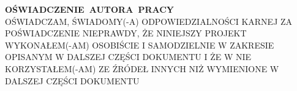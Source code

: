 \begin{titlepage}
\begin{flushright}
\begin{minipage}[!h]{13cm}
\mbox{\large{\scshape \textbf{OŚWIADCZENIE AUTORA PRACY}}}\\[3mm] 
{\scshape OŚWIADCZAM, ŚWIADOMY(-A) ODPOWIEDZIALNOŚCI KARNEJ ZA POŚWIADCZENIE NIEPRAWDY, ŻE NINIEJSZY PROJEKT WYKONAŁEM(-AM) OSOBIŚCIE I SAMODZIELNIE W ZAKRESIE OPISANYM W DALSZEJ CZĘŚCI DOKUMENTU I ŻE W NIE KORZYSTAŁEM(-AM) ZE ŹRÓDEŁ INNYCH NIŻ WYMIENIONE W DALSZEJ CZĘŚCI DOKUMENTU}\\
\end{minipage}

\vspace{2cm}

\makebox[6cm][s]{\dotfill}\par
{}

\end{flushright}
\end{titlepage}
